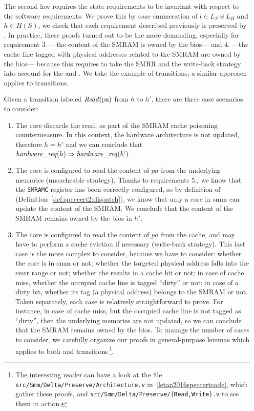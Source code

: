 The second law requires the state requirements to be invariant with respect to
the software requirements.
%
We prove this by case enumeration of \( l \in L_S \uplus L_H \) and
\( h \in H(S) \), we check that each requirement described previously is
preserved by .
%
In practice, these proofs turned out to be the more demanding, especially for
requirement 3. ---the content of the SMRAM is owned by the \ac{bios}--- and
4. ---the cache line tagged with physical addresses related to the SMRAM are
owned by the \ac{bios}--- because this requires to take the SMRR and the
write-back strategy into account for the  and .
%
We take the example of  transitions; a similar approach applies to
 transitions.

Given a transition labeled \( \mathit{Read}(\mathrm{pa}) \) from \( h \) to \( h' \),
there are three case scenarios to consider:
%
\begin{enumerate}
\item The core discards the read, as part of the SMRAM cache poisoning
  countermeasure.
  In this context, the hardware architecture is not updated, therefore
  \( h = h' \) and we can conclude that
  \( \mathit{hardware\_req}(h) \Rightarrow \mathit{hardware\_req}(h') \).
\item The core is configured to read the content of \( pa \) from the underlying
  memories (uncacheable strategy).
  Thanks to requirements 5., we know that the \texttt{SMRAMC} register has been
  correctly configured, so by definition of 
  (Definition~\ref{def:speccert2:dispatch}), we know that only a core in
  \ac{smm} can update the content of the SMRAM.
  We conclude that the content of the SMRAM remains owned by the \ac{bios} in
  \( h' \).
\item The core is configured to read the content of \( pa \) from the cache, and
  may have to perform a cache eviction if necessary (write-back strategy).
  This last case is the more complex to consider, because we have to consider:
  whether the core is in \ac{smm} or not;
  whether the targeted physical address falls into the \ac{smrr} range or not;
  whether the \IO results in a cache hit or not;
  in case of cache miss, whether the occupied cache line is tagged ``dirty'' or
  not;
  in case of a dirty bit, whether its tag (a physical address) belongs to the
  SMRAM or not.
  Taken separately, each case is relatively straightforward to prove.
  For instance, in case of cache miss, but the occupied cache line is not tagged
  as ``dirty'', then the underlying memories are not updated, so we can conclude
  that the SMRAM remains owned by the \ac{bios}.
  To manage the number of cases to consider, we carefully organize our proofs in
  general-purpose lemmas which applies to both  and 
  transitions\,\footnote{The interesting reader can have a look at the file
    \texttt{src/Smm/Delta/Preserve/Architecture.v}
    in~\ref{letan2016speccertcode}, which gather these proofs, and
    \texttt{src/Smm/Delta/Preserve/\{Read,Write\}.v} to see them in action.}.
\end{enumerate}
